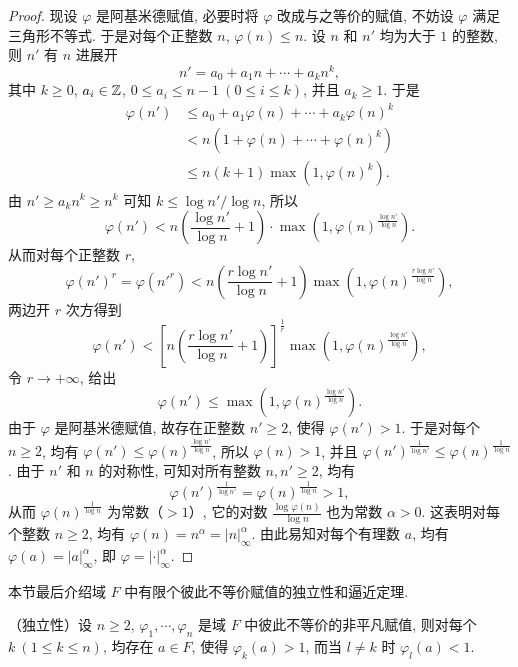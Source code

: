 \begin{proof}
现设 $\varphi$ 是阿基米德赋值, 必要时将 $\varphi$ 改成与之等价的赋值, 不妨设 $\varphi$ 满足三角形不等式. 于是对每个正整数 $n$, $\varphi(n)\leqslant n$. 设 $n$ 和 $n'$ 均为大于 $1$ 的整数, 则 $n'$ 有 $n$ 进展开
\[
  n'=a_0+a_1n+\cdots+a_kn^k,
\]
其中 $k\geqslant 0$, $a_i\in\mathbb{Z}$, $0\leqslant a_i\leqslant n-1\ (0\leqslant i\leqslant k)$, 并且 $a_k\geqslant 1$. 于是
\begin{align*}
  \varphi(n')&\leqslant a_0+a_1\varphi(n)+\cdots+a_k\varphi(n)^k\\
  &<n(1+\varphi(n)+\cdots+\varphi(n)^k)\\
  &\leqslant n(k+1)\max(1,\varphi(n)^k).
\end{align*}
由 $n'\geqslant a_kn^k\geqslant n^k$ 可知 $k\leqslant\log n'/\log n$, 所以
\[
  \varphi(n')<n\left(\frac{\log n'}{\log n}+1\right)\cdot\max\left(1,\varphi(n)^{\frac{\log n'}{\log n}}\right).
\]
从而对每个正整数 $r$,
\[
  \varphi(n')^r=\varphi(n'^r)<n\left(\frac{r\log n'}{\log n}+1\right)\max\left(1,\varphi(n)^{\frac{r\log n'}{\log n}}\right),
\]
两边开 $r$ 次方得到
\[
  \varphi(n')<\left[n\left(\frac{r\log n'}{\log n}+1\right)\right]^{\frac{1}{r}}\max\left(1,\varphi(n)^{\frac{\log n'}{\log n}}\right),
\]
令 $r\to+\infty$, 给出
\[
  \varphi(n')\leqslant\max\left(1,\varphi(n)^{\frac{\log n'}{\log n}}\right).
\]
由于 $\varphi$ 是阿基米德赋值, 故存在正整数 $n'\geqslant 2$, 使得 $\varphi(n')>1$. 于是对每个 $n\geqslant 2$, 均有 $\varphi(n')\leqslant\varphi(n)^{\frac{\log n'}{\log n}}$, 所以 $\varphi(n)>1$, 并且 $\varphi(n')^{\frac{1}{\log n'}}\leqslant\varphi(n)^{\frac{1}{\log n}}$. 由于 $n'$ 和 $n$ 的对称性, 可知对所有整数 $n,n'\geqslant 2$, 均有
\[
  \varphi(n')^{\frac{1}{\log n'}}=\varphi(n)^{\frac{1}{\log n}}>1,
\]
从而 $\varphi(n)^{\frac{1}{\log n}}$ 为常数（$>1$）, 它的对数 $\frac{\log\varphi(n)}{\log n}$ 也为常数 $\alpha>0$. 这表明对每个整数 $n\geqslant 2$, 均有 $\varphi(n)=n^{\alpha}=|n|_{\infty}^{\alpha}$. 由此易知对每个有理数 $a$, 均有 $\varphi(a)=|a|_{\infty}^{\alpha}$, 即 $\varphi=|\cdot|_{\infty}^{\alpha}$.
\end{proof}

本节最后介绍域 $F$ 中有限个彼此不等价赋值的独立性和逼近定理.

\begin{theorem}\label{thm:7.3}
（独立性）设 $n\geqslant 2$, $\varphi_1,\cdots,\varphi_n$ 是域 $F$ 中彼此不等价的非平凡赋值, 则对每个 $k\ (1\leqslant k\leqslant n)$, 均存在 $a\in F$, 使得 $\varphi_k(a)>1$, 而当 $l\neq k$ 时 $\varphi_l(a)<1$.
\end{theorem}

